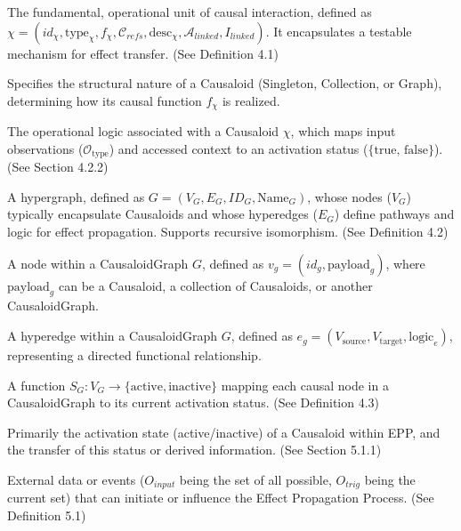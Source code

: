 \begin{description}[style=nextline]
    \item[Causaloid (\(\chi\))] 
    The fundamental, operational unit of causal interaction, defined as \( \chi = (id_\chi, \text{type}_\chi, f_\chi, \mathcal{C}_{refs}, \text{desc}_\chi, \mathcal{A}_{linked}, I_{linked}) \). It encapsulates a testable mechanism for effect transfer. (See Definition 4.1)

    \item[Causaloid Type (\(\text{type}_\chi\))] 
    Specifies the structural nature of a Causaloid (Singleton, Collection, or Graph), determining how its causal function \(f_\chi\) is realized.

    \item[Causal Function (\(f_\chi\))] 
    The operational logic associated with a Causaloid \(\chi\), which maps input observations (\(\mathcal{O}_{\text{type}}\)) and accessed context to an activation status (\(\{\text{true, false}\}\)). (See Section 4.2.2)

    \item[CausaloidGraph (\(G\))] 
    A hypergraph, defined as \( G = (V_G, E_G, ID_G, \text{Name}_G) \), whose nodes (\(V_G\)) typically encapsulate Causaloids and whose hyperedges (\(E_G\)) define pathways and logic for effect propagation. Supports recursive isomorphism. (See Definition 4.2)

    \item[Causal Node (\(v_g\))] 
    A node within a CausaloidGraph \(G\), defined as \(v_g = (id_g, \text{payload}_g)\), where \(\text{payload}_g\) can be a Causaloid, a collection of Causaloids, or another CausaloidGraph.

    \item[Causal Hyperedge (\(e_g\))] 
    A hyperedge within a CausaloidGraph \(G\), defined as \(e_g = (V_{\text{source}}, V_{\text{target}}, \text{logic}_e)\), representing a directed functional relationship.

    \item[State of CausaloidGraph (\(S_G\))] 
    A function \(S_G: V_G \to \{\text{active}, \text{inactive}\}\) mapping each causal node in a CausaloidGraph to its current activation status. (See Definition 4.3)

    \item[Effect (\(\varepsilon\))] 
    Primarily the activation state (active/inactive) of a Causaloid within EPP, and the transfer of this status or derived information. (See Section 5.1.1)

    \item[Input Observations/Triggers (\(O_{input}, O_{trig}\))] 
    External data or events (\(O_{input}\) being the set of all possible, \(O_{trig}\) being the current set) that can initiate or influence the Effect Propagation Process. (See Definition 5.1)


\end{description}
